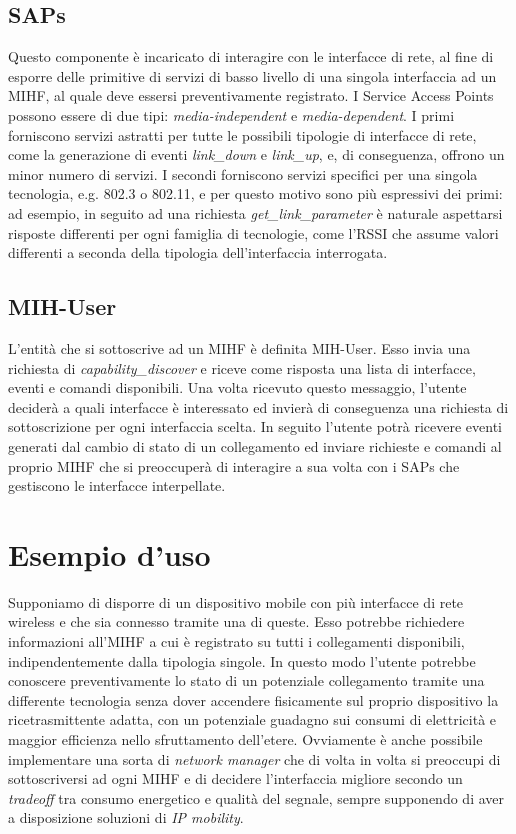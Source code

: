 \subsection{SAPs}
Questo componente è incaricato di interagire con le interfacce di rete, al fine di esporre delle primitive di servizi di basso livello di una singola interfaccia ad un MIHF, al quale deve essersi preventivamente registrato.
I Service Access Points possono essere di due tipi: {\em media-independent} e {\em media-dependent}.
I primi forniscono servizi astratti per tutte le possibili tipologie di interfacce di rete, come la generazione di eventi {\em link\_down} e {\em link\_up}, e, di conseguenza, offrono un minor numero di servizi.
I secondi forniscono servizi specifici per una singola tecnologia, e.g. 802.3 o 802.11, e per questo motivo sono più espressivi dei primi: ad esempio, in seguito ad una richiesta {\em get\_link\_parameter} è naturale aspettarsi risposte differenti per ogni famiglia di tecnologie, come l'RSSI che assume valori differenti a seconda della tipologia dell'interfaccia interrogata. 

\subsection{MIH-User}
L'entità che si sottoscrive ad un MIHF è definita MIH-User. Esso invia una richiesta di {\em capability\_discover} e riceve come risposta una lista di interfacce, eventi e comandi disponibili. Una volta ricevuto questo messaggio, l'utente deciderà a quali interfacce è interessato ed invierà di conseguenza una richiesta di sottoscrizione per ogni interfaccia scelta. In seguito l'utente potrà ricevere eventi generati dal cambio di stato di un collegamento ed inviare richieste e comandi al proprio MIHF che si preoccuperà di interagire a sua volta con i SAPs che gestiscono le interfacce interpellate.

\section{Esempio d'uso}
Supponiamo di disporre di un dispositivo mobile con più interfacce di rete wireless e che sia connesso tramite una di queste. Esso potrebbe richiedere informazioni all'MIHF a cui è registrato su tutti i  collegamenti disponibili, indipendentemente dalla tipologia singole. In questo modo l'utente potrebbe conoscere preventivamente lo stato di un potenziale collegamento tramite una differente tecnologia senza dover accendere fisicamente sul proprio dispositivo la ricetrasmittente adatta, con un potenziale guadagno sui consumi di elettricità e maggior efficienza nello sfruttamento dell'etere. Ovviamente è anche possibile implementare una sorta di {\em network manager} che di volta in volta si preoccupi di sottoscriversi ad ogni MIHF e di decidere l'interfaccia migliore secondo un {\em tradeoff} tra consumo energetico e qualità del segnale, sempre supponendo di aver a disposizione soluzioni di {\em IP mobility}.

